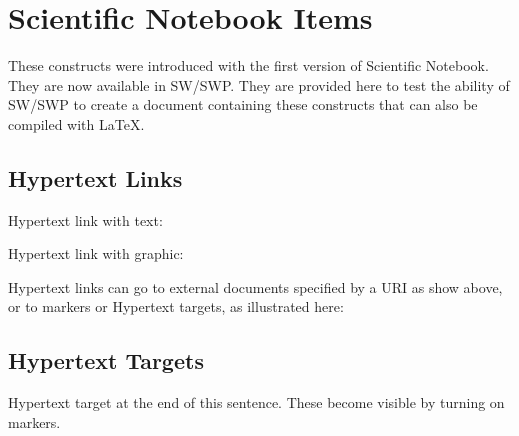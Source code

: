 \documentclass{article}
\begin{document}
\section{Scientific Notebook Items}

These constructs were introduced with the first version of Scientific
Notebook. They are now available in SW/SWP. They are provided here to test
the ability of SW/SWP to create a document containing these constructs that
can also be compiled with \LaTeX{}.

\subsection{Hypertext Links}

Hypertext link with text: 
%

Hypertext link with graphic: 
%

Hypertext links can go to external documents specified by a URI as show
above, or to markers or Hypertext targets, as illustrated here: 
%

\subsection{Hypertext Targets}

Hypertext target at the end of this sentence.\label{my target} These become
visible by turning on markers.
\end{document}
